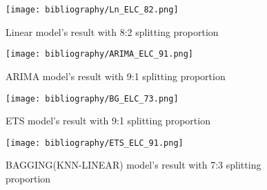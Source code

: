 \documentclass{ieeeojies}
\begin{document}
\begin{figure}[H]
  \centering
  \begin{minipage}{0.8\linewidth}
    \centering
    \texttt{[image: bibliography/Ln\_ELC\_82.png]}
    \caption{Linear model's result with 8:2 splitting proportion}
    \label{fig8}
  \end{minipage}
\end{figure}
\begin{figure}[H]
  \centering
  \begin{minipage}{0.8\linewidth}
    \centering
    \texttt{[image: bibliography/ARIMA\_ELC\_91.png]}
    \caption{ARIMA model's result with 9:1 splitting proportion}
    \label{fig11}
  \end{minipage}
\end{figure}
\begin{figure}[H]
  \centering
  \begin{minipage}{0.8\linewidth}
    \centering
    \texttt{[image: bibliography/BG\_ELC\_73.png]}
    \caption{ETS model's result with 9:1 splitting proportion}
    \label{fig12}
  \end{minipage}
\end{figure}
\begin{figure}[H]
  \centering
  \begin{minipage}{0.8\linewidth}
    \centering
    \texttt{[image: bibliography/ETS\_ELC\_91.png]}
    \caption{BAGGING(KNN-LINEAR) model's result with 7:3 splitting proportion}
    \label{fig12}
  \end{minipage}
\end{figure}
\end{document}
